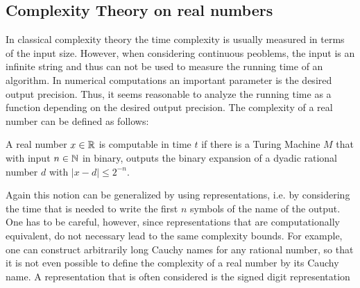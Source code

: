 	\subsection{Complexity Theory on real numbers}
	In classical complexity theory the time complexity is usually measured in terms of the input size.
	However, when considering continuous peoblems, the input is an infinite string and thus can not 
	be used to measure the running time of an algorithm.
	In numerical computations an important parameter is the desired output precision.
	Thus, it seems reasonable to analyze the running time as a function depending on the desired output precision.
	The complexity of a real number can be defined as follows:
	\begin{definition}
		A real number $x \in \mathbb R$ is computable in time $t$ if there is a Turing Machine $M$ that with input $n \in \mathbb N$ in binary, 
		outputs the binary expansion of a dyadic rational number $d$ with $| x - d | \leq 2^{-n}$.  
	\end{definition}
	Again this notion can be generalized by using representations, i.e. by considering the time that is needed to write the first $n$ symbols
	of the name of the output.
	One has to be careful, however, since representations that are computationally equivalent, do not necessary lead to the same complexity bounds.
	For example, one can construct arbitrarily long Cauchy names for any rational number, so that it is not even possible to define the complexity 
	of a real number by its Cauchy name.
	A representation that is often considered is the signed digit representation
	\begin{definition}
		
	\end{definition}